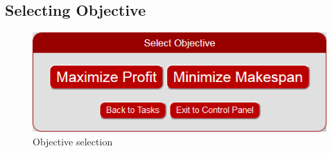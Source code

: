 \subsection{Selecting Objective}

\begin{figure}[htbp]
\centering
\includegraphics[width=0.8\linewidth]{Images/DefineObjective.png}
\caption{Objective selection}
\label{fig:selectObjective}
\end{figure}